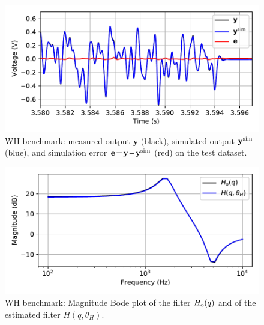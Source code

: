 \documentclass{article}
\newcommand{\tvec}[1]{\mathbf{#1}}
\newcommand{\simul}{{\rm sim}}
\begin{document}
\begin{figure}
	\centering
	\includegraphics[width=.7\textwidth]{fig/WH_timetrace_zoom.pdf} \vspace{-0.55cm}
	\caption{WH benchmark: measured output $\tvec{y}$ (black), simulated output $\tvec{y}^{\simul}$ (blue), and simulation error $\tvec{e}\! =\! \tvec{y}\! -\! \tvec{y}^{\simul}$ (red) on the  test dataset. 
}
	\label{fig:WH_timetrace}
\end{figure}

\begin{figure}
	\centering
	\includegraphics[width=.8\textwidth]{fig/WH_H.pdf} \vspace{-0.4cm}
	\caption{WH benchmark: Magnitude Bode plot of the filter $H_{\rm o}(q)$ and of the estimated filter $H(q,\theta_H)$.}
	\label{fig:WH_H}
\end{figure}
\end{document}
